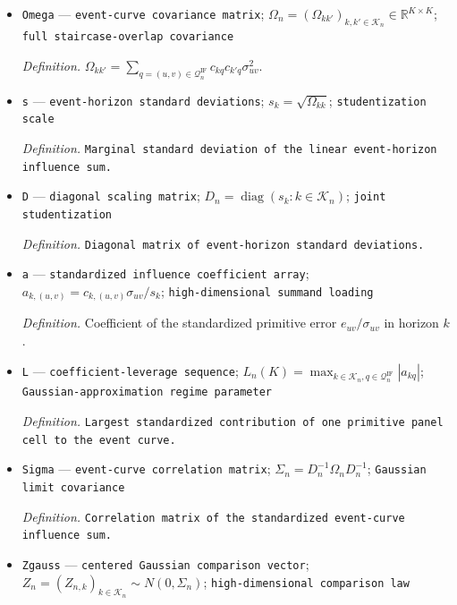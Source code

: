 \documentclass{article}
\begin{document}
\begin{itemize}
  \par\smallskip\noindent\emph{Definition.} Primitive cells whose exact aggregated influence coefficients are nonzero at both horizons \(k\) and \(k'\).
  \item \texttt{Omega} --- \texttt{event-\allowbreak{}curve covariance matrix}; \(\Omega_n=(\Omega_{kk'})_{k,k'\in\mathcal K_n}\in\mathbb R^{K\times K}\); \texttt{full staircase-\allowbreak{}overlap covariance}
  \par\smallskip\noindent\emph{Definition.} \(\Omega_{kk'}=\sum_{q=(u,v)\in\mathcal Q_n^{\mathrm{IF}}}c_{kq}c_{k'q}\sigma_{uv}^2\).
  \item \texttt{s} --- \texttt{event-\allowbreak{}horizon standard deviations}; \(s_k=\sqrt{\Omega_{kk}}\); \texttt{studentization scale}
  \par\smallskip\noindent\emph{Definition.} \texttt{Marginal standard deviation of the linear event-\allowbreak{}horizon influence sum.}
  \item \texttt{D} --- \texttt{diagonal scaling matrix}; \(D_n=\operatorname{diag}(s_k:k\in\mathcal K_n)\); \texttt{joint studentization}
  \par\smallskip\noindent\emph{Definition.} \texttt{Diagonal matrix of event-\allowbreak{}horizon standard deviations.}
  \item \texttt{a} --- \texttt{standardized influence coefficient array}; \(a_{k,(u,v)}=c_{k,(u,v)}\sigma_{uv}/s_k\); \texttt{high-\allowbreak{}dimensional summand loading}
  \par\smallskip\noindent\emph{Definition.} Coefficient of the standardized primitive error \(e_{uv}/\sigma_{uv}\) in horizon \(k\).
  \item \texttt{L} --- \texttt{coefficient-\allowbreak{}leverage sequence}; \(L_n(K)=\max_{k\in\mathcal K_n,q\in\mathcal Q_n^{\mathrm{IF}}}|a_{kq}|\); \texttt{Gaussian-\allowbreak{}approximation regime parameter}
  \par\smallskip\noindent\emph{Definition.} \texttt{Largest standardized contribution of one primitive panel cell to the event curve.}
  \item \texttt{Sigma} --- \texttt{event-\allowbreak{}curve correlation matrix}; \(\Sigma_n=D_n^{-1}\Omega_nD_n^{-1}\); \texttt{Gaussian limit covariance}
  \par\smallskip\noindent\emph{Definition.} \texttt{Correlation matrix of the standardized event-\allowbreak{}curve influence sum.}
  \item \texttt{Zgauss} --- \texttt{centered Gaussian comparison vector}; \(Z_n=(Z_{n,k})_{k\in\mathcal K_n}\sim N(0,\Sigma_n)\); \texttt{high-\allowbreak{}dimensional comparison law}

\end{itemize}
\end{document}
